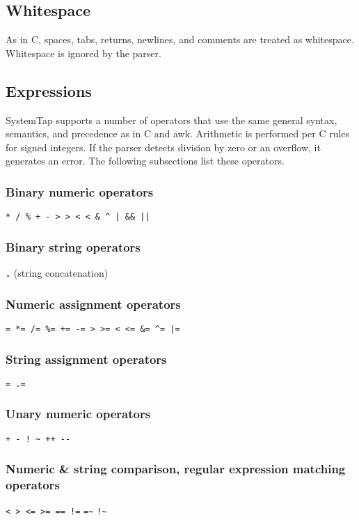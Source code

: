 \documentclass[twoside,english]{article}
\begin{document}
\subsection{Whitespace}
As in C, spaces, tabs, returns, newlines, and comments are treated as whitespace.
Whitespace is ignored by the parser.


\subsection{Expressions}
SystemTap supports a number of operators that use the same general syntax,
semantics, and precedence as in C and awk. Arithmetic is performed per C
rules for signed integers. If the parser detects division by zero or an overflow,
it generates an error. The following subsections list these operators.

\subsubsection{Binary numeric operators}
\texttt{{*} / \% + - >\,{}> <\,{}< \& \textasciicircum{}
| \&\& ||}

\subsubsection{Binary string operators}
\texttt{\textbf{.}} (string concatenation)

\subsubsection{Numeric assignment operators}
\texttt{= {*}= /= \%= += -= >\,{}>= <\,{}<=
\&= \textasciicircum{}= |=}

\subsubsection{String assignment operators}

\texttt{= .=}

\subsubsection{Unary numeric operators}
\texttt{+ - ! \textasciitilde{} ++ -{}-}

\subsubsection{Numeric \& string comparison, regular expression matching operators}
\texttt{< > <= >= == !=} \verb+=~+ \verb+!~+
\end{document}
